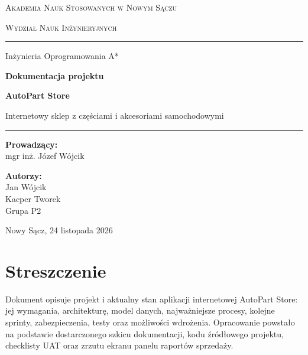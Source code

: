 \documentclass[12pt,a4paper]{article}
\begin{document}
\begin{titlepage}
    \thispagestyle{empty}
    \centering
    \vspace*{1cm}
    {\Large\scshape Akademia Nauk Stosowanych w Nowym Sączu\par}
    \vspace{0.25cm}
    {\large\scshape Wydział Nauk Inżynieryjnych\par}
    \vspace{0.8cm}
    \rule{\textwidth}{1.2pt}\par
    \vspace{1.8cm}
    {\Large Inżynieria Oprogramowania A*\par}
    \vspace{0.8cm}
    {\huge\bfseries\color{navy} Dokumentacja projektu\par}
    \vspace{0.35cm}
    {\LARGE\bfseries\color{orange} AutoPart Store\par}
    \vspace{0.7cm}
    {\large Internetowy sklep z częściami i akcesoriami samochodowymi\par}
    \vspace{1cm}
    \rule{0.55\textwidth}{0.5pt}\par
    \vfill
    \begin{minipage}{0.45\textwidth}
        \raggedright
        \textbf{Prowadzący:}\\
        mgr inż. Józef Wójcik
    \end{minipage}
    \begin{minipage}{0.45\textwidth}
        \raggedleft
        \textbf{Autorzy:}\\
        Jan Wójcik\\
        Kacper Tworek\\
        Grupa P2
    \end{minipage}
    \vfill
    {\large Nowy Sącz, 24 listopada 2026\par}
\end{titlepage}

\tableofcontents
\newpage
{}

\section*{Streszczenie}
Dokument opisuje projekt i aktualny stan aplikacji internetowej AutoPart Store:
jej wymagania, architekturę, model danych, najważniejsze procesy, kolejne sprinty,
zabezpieczenia, testy oraz możliwości wdrożenia. Opracowanie powstało na podstawie
dostarczonego szkicu dokumentacji, kodu źródłowego projektu, checklisty UAT oraz
zrzutu ekranu panelu raportów sprzedaży.
\end{document}
